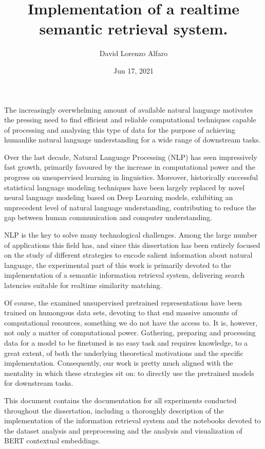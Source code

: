 \documentclass[letterpaper,10pt,english]{sphinxmanual}
\title{Implementation of a real\sphinxhyphen{}time semantic retrieval system.\@{}}
\date{Jun 17, 2021}
\author{David Lorenzo Alfaro}
\begin{document}
\pagestyle{empty}
\sphinxmaketitle
\pagestyle{plain}
\sphinxtableofcontents
\pagestyle{normal}
\label{\detokenize{index::doc}}


The increasingly overwhelming amount of available natural language motivates the pressing need to find efficient and reliable computational techniques capable of processing and analysing this type of data for the purpose of achieving human\sphinxhyphen{}like natural language understanding for a wide range of downstream tasks.

Over the last decade, Natural Language Processing (NLP) has seen impressively fast growth, primarily favoured by the increase in computational power and the progress on unsupervised learning in linguistics. Moreover, historically successful statistical language modeling techniques have been largely replaced by novel neural language modeling based on Deep Learning models, exhibiting an unprecedent level of natural language understanding, contributing to reduce the gap between human communication and computer understanding.

NLP is the key to solve many technological challenges. Among the large number of applications this field has, and since this dissertation has been entirely focused on the study of different strategies to encode salient information about natural language, the experimental part of this work is primarily devoted to the implementation of a semantic information retrieval system, delivering search latencies suitable for real\sphinxhyphen{}time similarity matching.

Of course, the examined unsupervised pretrained representations have been trained on humongous data sets, devoting to that end massive amounts of computational resources, something we do not have the access to.  It is, however, not only a matter of computational power.  Gathering, preparing and processing data for a model to be fine\sphinxhyphen{}tuned is no easy task and requires knowledge, to a great extent, of both the underlying theoretical motivations and the specific implementation. Consequently, our work is pretty much aligned with the mentality in which these strategies sit on: to directly use the pretrained models for downstream tasks.

This document contains the documentation for all experiments conducted throughout the dissertation, including a thoroughly description of the implementation of the information retrieval system and the notebooks devoted to the dataset analysis and preprocessing and the analysis and visualization of BERT contextual embeddings.
\end{document}
